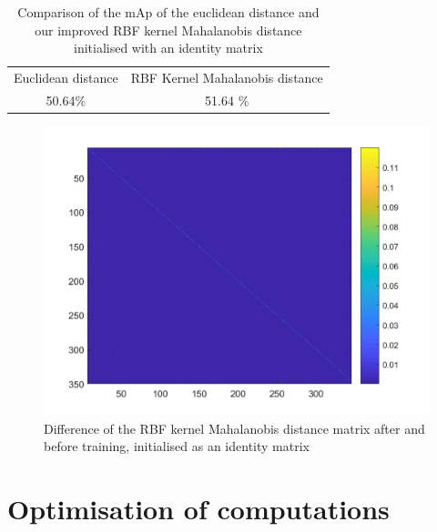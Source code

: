\documentclass[10pt,technote]{IEEEtran}
\begin{document}
\begin{table}
    \centering
    \begin{tabular}{c|c}
        Euclidean distance & RBF Kernel Mahalanobis distance \\
        50.64\% & 51.64 \%
    \end{tabular}
    \caption{Comparison of the mAp of the euclidean distance and our improved RBF kernel Mahalanobis distance initialised with an identity matrix}
    \label{tab:my_label}
\end{table}
\begin{figure}
    \centering
    \includegraphics[width=\linewidth]{Graphs/A_matrix_diff.png}
    \caption{Difference of the RBF kernel Mahalanobis distance matrix after and before training, initialised as an identity matrix}
    \label{fig:diff_matrix}
\end{figure}
\appendices

\section{Optimisation of computations}
\end{document}
